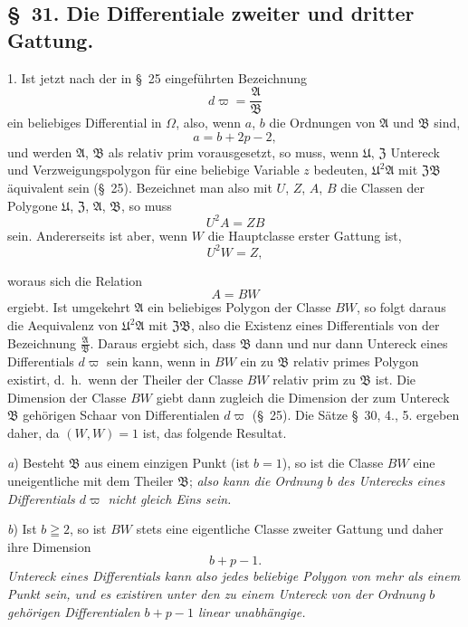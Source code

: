\documentclass{article}
\begin{document}
\subsection*{§~31. Die Differentiale zweiter und dritter Gattung.}

1. Ist jetzt nach der in §~25 eingeführten Bezeichnung
\[ d\varpi = \frac{\mathfrak{A}}{\mathfrak{B}} \]
ein beliebiges Differential in $\Omega$, also, wenn $a$, $b$ die Ordnungen von $\mathfrak{A}$ und $\mathfrak{B}$ sind,
\[ a = b+2p-2, \]
und werden $\mathfrak{A}$, $\mathfrak{B}$ als relativ prim vorausgesetzt, so muss, wenn $\mathfrak{U}$, $\mathfrak{Z}$ Untereck und Verzweigungspolygon für eine beliebige Variable $z$ bedeuten, $\mathfrak{U}^{2}\mathfrak{A}$ mit $\mathfrak{Z}\mathfrak{B}$ äquivalent sein (§~25). Bezeichnet man also mit $U$, $Z$, $A$, $B$ die Classen der Polygone $\mathfrak{U}$, $\mathfrak{Z}$, $\mathfrak{A}$, $\mathfrak{B}$, so muss
\[ U^{2}A = ZB \]
sein. Andererseits ist aber, wenn $W$ die Hauptclasse erster Gattung ist,
\[ U^{2}W = Z, \]

woraus sich die Relation
\[ A = BW \]
ergiebt. Ist umgekehrt $\mathfrak{A}$ ein beliebiges Polygon der Classe $BW$, so folgt daraus die Aequivalenz von $\mathfrak{U}^{2}\mathfrak{A}$ mit $\mathfrak{Z}\mathfrak{B}$, also die Existenz eines Differentials von der Bezeichnung $\frac{\mathfrak{A}}{\mathfrak{B}}$. Daraus ergiebt sich, dass $\mathfrak{B}$ dann und nur dann Untereck eines Differentials $d\varpi$ sein kann, wenn in $BW$ ein zu $\mathfrak{B}$ relativ primes Polygon existirt, d.\ h.\ wenn der Theiler der Classe $BW$ relativ prim zu $\mathfrak{B}$ ist. Die Dimension der Classe $BW$ giebt dann zugleich die Dimension der zum Untereck $\mathfrak{B}$ gehörigen Schaar von Differentialen $d\varpi$ (§~25). Die Sätze §~30, 4., 5. ergeben daher, da $(W, W) = 1$ ist, das folgende Resultat.

\emph{a}) Besteht $\mathfrak{B}$ aus einem einzigen Punkt (ist $b = 1$), so ist die Classe $BW$ eine uneigentliche mit dem Theiler $\mathfrak{B}$; \emph{also kann die Ordnung $b$ des Unterecks eines Differentials $d\varpi$ nicht gleich Eins sein.}

\emph{b}) Ist $b \geqq 2$, so ist $BW$ stets eine eigentliche Classe zweiter Gattung und daher ihre Dimension
\[ b+p-1. \]
\emph{Untereck eines Differentials kann also jedes beliebige Polygon von mehr als einem Punkt sein, und es existiren unter den zu einem Untereck von der Ordnung $b$ gehörigen Differentialen $b+p-1$ linear unabhängige.}
\end{document}

